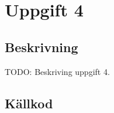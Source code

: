 \section{Uppgift 4}\label{uppgift-4}

\subsection{Beskrivning}
TODO: Beskriving uppgift 4.

\subsection{Källkod}\label{uppgift-4_src}
\inputminted[]{java}{../src/Lab1Uppg04.java}
